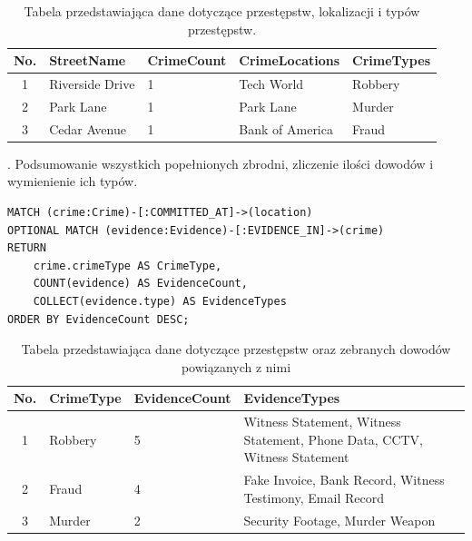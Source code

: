 \documentclass[a4paper,12pt]{article}
\begin{document}
\begin{table}[h!]
\centering
\begin{tabular}{|c|l|l|l|l|}
\hline
\textbf{No.} & \textbf{StreetName}     & \textbf{CrimeCount} & \textbf{CrimeLocations}     & \textbf{CrimeTypes} \\ \hline
1            & Riverside Drive         & 1                   &Tech World              & Robbery         \\ \hline
2            & Park Lane               & 1                   &Park Lane               & Murder          \\ \hline
3            & Cedar Avenue            & 1                   &Bank of America         & Fraud           \\ \hline
\end{tabular}
\caption{Tabela przedstawiająca dane dotyczące przestępstw, lokalizacji i typów przestępstw.}
\label{tab:crime_data}
\end{table}

. Podsumowanie wszystkich popełnionych zbrodni, zliczenie ilości dowodów i wymienienie ich typów.

\begin{center}
\begin{minipage}{0.8\linewidth}
\begin{lstlisting}[language=Cypher, basicstyle=\small, breaklines=true]
MATCH (crime:Crime)-[:COMMITTED_AT]->(location)
OPTIONAL MATCH (evidence:Evidence)-[:EVIDENCE_IN]->(crime)
RETURN 
    crime.crimeType AS CrimeType,
    COUNT(evidence) AS EvidenceCount,
    COLLECT(evidence.type) AS EvidenceTypes
ORDER BY EvidenceCount DESC;
\end{lstlisting}
\end{minipage}
\end{center}

\begin{table}[h!]
\centering
\begin{tabular}{|c|l|l|p{8cm}|}
\hline
\textbf{No.} & \textbf{CrimeType}     & \textbf{EvidenceCount} & \textbf{EvidenceTypes} \\ \hline
1            & Robbery & 5              & Witness Statement, Witness Statement, Phone Data, CCTV, Witness Statement \\ \hline
2            & Fraud & 4               & Fake Invoice, Bank Record, Witness Testimony, Email Record \\ \hline
3            & Murder & 2              & Security Footage, Murder Weapon \\ \hline
\end{tabular}
\caption{Tabela przedstawiająca dane dotyczące przestępstw oraz zebranych dowodów powiązanych z nimi}
\label{tab:crime_data}
\end{table}
\end{document}
